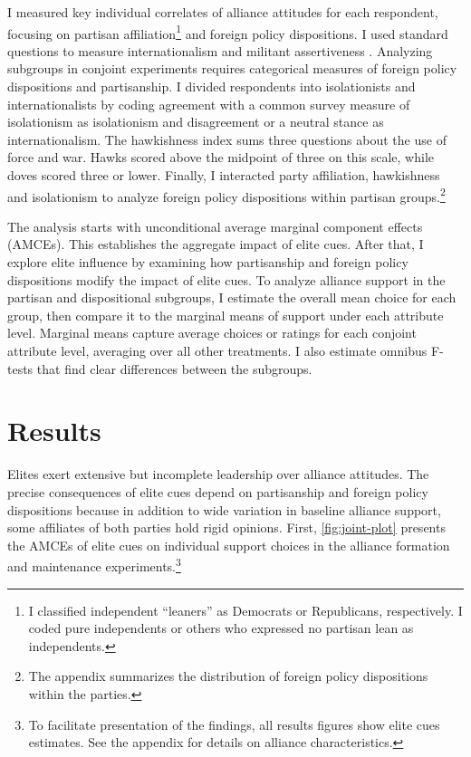 \documentclass[12pt]{article}
\begin{document}
I measured key individual correlates of alliance attitudes for each respondent, focusing on partisan affiliation\footnote{I classified independent ``leaners'' as Democrats or Republicans, respectively. I coded pure independents or others who expressed no partisan lean as independents.} and foreign policy dispositions. 
I used standard questions to measure internationalism and militant assertiveness \citep{KertzerBrutger2016}.
Analyzing subgroups in conjoint experiments requires categorical measures of foreign policy dispositions and partisanship.
I divided respondents into isolationists and internationalists by coding agreement with a common survey measure of isolationism as isolationism and disagreement or a neutral stance as internationalism. 
The hawkishness index sums three questions about the use of force and war. 
Hawks scored above the midpoint of three on this scale, while doves scored three or lower. 
Finally, I interacted party affiliation, hawkishness and isolationism to analyze foreign policy dispositions within partisan groups.\footnote{The appendix summarizes the distribution of foreign policy dispositions within the parties.} 


The analysis starts with unconditional average marginal component effects (AMCEs).
This establishes the aggregate impact of elite cues. 
After that, I explore elite influence by examining how partisanship and foreign policy dispositions modify the impact of elite cues. 
To analyze alliance support in the partisan and dispositional subgroups, I estimate the overall mean choice for each group, then compare it to the marginal means of support under each attribute level.
Marginal means capture average choices or ratings for each conjoint attribute level, averaging over all other treatments. 
I also estimate omnibus F-tests \citep{Leeperetal2020} that find clear differences between the subgroups.  


\section{Results} 


Elites exert extensive but incomplete leadership over alliance attitudes.
The precise consequences of elite cues depend on partisanship and foreign policy dispositions because in addition to wide variation in baseline alliance support, some affiliates of both parties hold rigid opinions. 
First, \autoref{fig:joint-plot} presents the AMCEs of elite cues on individual support choices in the alliance formation and maintenance experiments.\footnote{To facilitate presentation of the findings, all results figures show elite cues estimates. See the appendix for details on alliance characteristics.}
\end{document}
